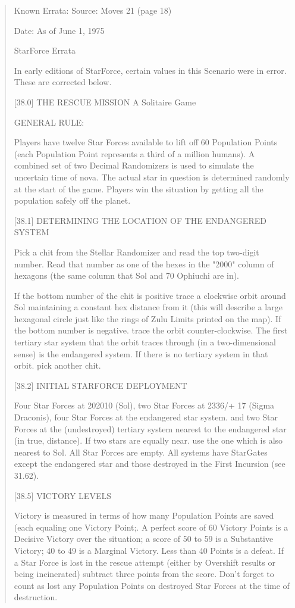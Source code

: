 \documentclass[10pt]{article}
\begin{document}
\begin{quote}
Known Errata:
Source: Moves 21 (page 18)

Date: As of June 1, 1975

StarForce Errata

In early editions of StarForce, certain values in this Scenario were in error.
These are corrected below.

[38.0] THE RESCUE MISSION
A Solitaire Game

GENERAL RULE:

Players have twelve Star Forces available to lift off 60 Population Points
(each Population Point represents a third of a million humans). A combined set
of two Decimal Randomizers is used to simulate the uncertain time of nova. The
actual star in question is determined randomly at the start of the game.
Players win the situation by getting all the population safely off the planet.

[38.1] DETERMINING THE LOCATION OF THE ENDANGERED SYSTEM

Pick a chit from the Stellar Randomizer and read the top two-digit number. Read
that number as one of the hexes in the "2000" column of hexagons (the same
column that Sol and 70 Ophiuchi are in).

If the bottom number of the chit is positive trace a clockwise orbit around Sol
maintaining a constant hex distance from it (this will describe a large
hexagonal circle just like the rings of Zulu Limits printed on the map). If the
bottom number is negative. trace the orbit counter-clockwise. The first
tertiary star system that the orbit traces through (in a two-dimensional sense)
is the endangered system. If there is no tertiary system in that orbit. pick
another chit.

[38.2] INITIAL STARFORCE DEPLOYMENT

Four Star Forces at 202010 (Sol), two Star Forces at 2336/+ 17 (Sigma
Draconis), four Star Forces at the endangered star system. and two Star Forces
at the (undestroyed) tertiary system nearest to the endangered star (in true,
distance). If two stars are equally near. use the one which is also nearest to
Sol. All Star Forces are empty. All systems have StarGates except the
endangered star and those destroyed in the First Incursion (see 31.62).

[38.5] VICTORY LEVELS

Victory is measured in terms of how many Population Points are saved (each
equaling one Victory Point;. A perfect score of 60 Victory Points is a Decisive
Victory over the situation; a score of 50 to 59 is a Substantive Victory; 40 to
49 is a Marginal Victory. Less than 40 Points is a defeat. If a Star Force is
lost in the rescue attempt (either by Overshift results or being incinerated)
subtract three points from the score. Don't forget to count as lost any
Population Points on destroyed Star Forces at the time of destruction.
\end{quote}
\end{document}
